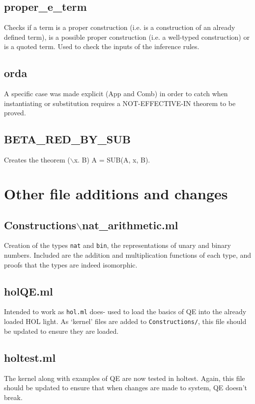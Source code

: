 \documentclass{article}
\def\c#1{\texttt{#1}}
\begin{document}
\subsection{proper\_e\_term}
Checks if a term is a proper construction (i.e. is a construction of an already defined term), is a possible proper construction (i.e. a well-typed construction) or is a quoted term. Used to check the inputs of the inference rules. 

\subsection{orda}
A specific case was made explicit (App and Comb) in order to catch when instantiating or substitution requires a NOT-EFFECTIVE-IN theorem to be proved.

\subsection{BETA\_RED\_BY\_SUB}
Creates the theorem ($\backslash$x. B) A = SUB(A, x, B). 

\newpage
\section{Other file additions and changes}
\subsection{Constructions$\backslash$nat\_arithmetic.ml}
Creation of the types \c{nat} and \c{bin}, the representations of unary and binary numbers. Included are the addition and multiplication functions of each type, and proofs that the types are indeed isomorphic.   

\subsection{holQE.ml}
Intended to work as \c{hol.ml} does- used to load the basics of QE into the already loaded HOL light. As `kernel' files are added to \c{Constructions/}, this file should be updated to ensure they are loaded.

\subsection{holtest.ml}
The kernel along with examples of QE are now tested in holtest. Again, this file should be updated to ensure that when changes are made to system, QE doesn't break.
\end{document}
